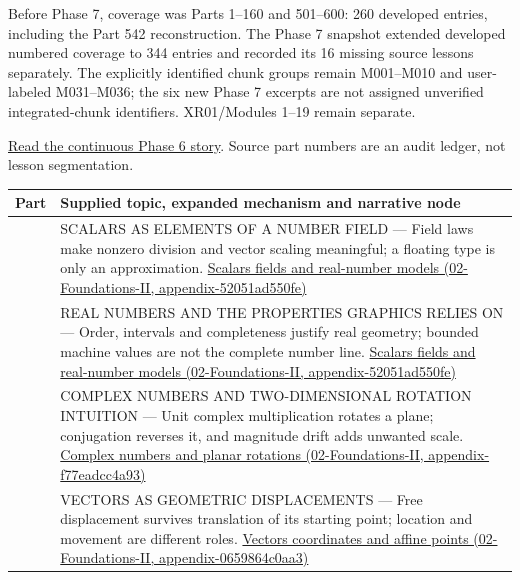 Before Phase 7, coverage was Parts 1--160 and 501--600: 260 developed entries, including the Part 542 reconstruction. The Phase 7 snapshot extended developed numbered coverage to 344 entries and recorded its 16 missing source lessons separately. The explicitly identified chunk groups remain M001--M010 and user-labeled M031--M036; the six new Phase 7 excerpts are not assigned unverified integrated-chunk identifiers. XR01/Modules 1--19 remain separate.

\href{Continuous\%20Notes/Computing\%20Foundations\%20-\%20From\%20Bits\%20to\%20C++\%20and\%20Systems\%20APIs\#The\%20panel\%20gives\%20us\%20a\%20reason\%20to\%20learn}{Read the continuous Phase 6 story}. Source part numbers are an audit ledger, not lesson segmentation.

{\def\LTcaptype{none} %
\begin{longtable}[]{@{}
  >{\raggedright\arraybackslash}p{}
  >{\raggedright\arraybackslash}p{}@{}}
\toprule\noalign{}
\begin{minipage}[b]{\linewidth}\raggedright
Part
\end{minipage} & \begin{minipage}[b]{\linewidth}\raggedright
Supplied topic, expanded mechanism and narrative node
\end{minipage} \\
\midrule\noalign{}
\endhead
\bottomrule\noalign{}
\endlastfoot
501 & SCALARS AS ELEMENTS OF A NUMBER FIELD --- Field laws make nonzero division and vector scaling meaningful; a floating type is only an approximation. \href{}{Scalars fields and real-number models (02-Foundations-II, appendix-52051ad550fe)} \\
502 & REAL NUMBERS AND THE PROPERTIES GRAPHICS RELIES ON --- Order, intervals and completeness justify real geometry; bounded machine values are not the complete number line. \href{}{Scalars fields and real-number models (02-Foundations-II, appendix-52051ad550fe)} \\
503 & COMPLEX NUMBERS AND TWO-DIMENSIONAL ROTATION INTUITION --- Unit complex multiplication rotates a plane; conjugation reverses it, and magnitude drift adds unwanted scale. \href{}{Complex numbers and planar rotations (02-Foundations-II, appendix-f77eadcc4a93)} \\
504 & VECTORS AS GEOMETRIC DISPLACEMENTS --- Free displacement survives translation of its starting point; location and movement are different roles. \href{}{Vectors coordinates and affine points (02-Foundations-II, appendix-0659864c0aa3)} \\

\end{longtable}}
